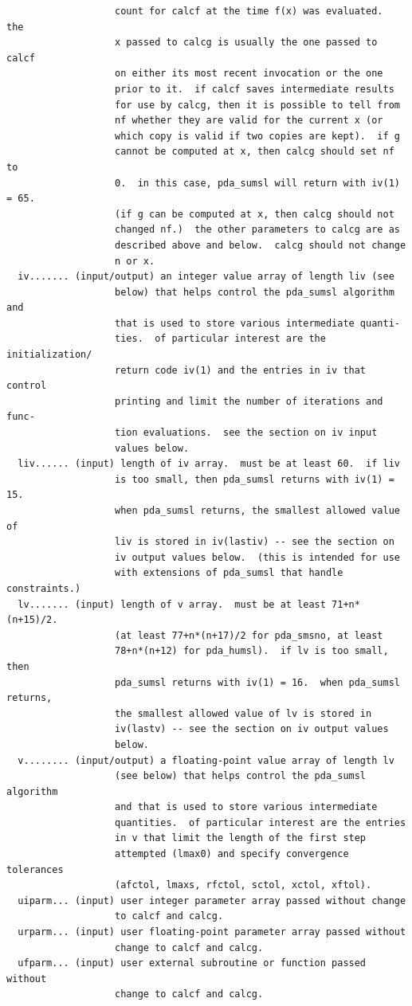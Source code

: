 \documentclass[11pt,twoside]{article}
\begin{document}
\begin{verbatim}
                   count for calcf at the time f(x) was evaluated.  the
                   x passed to calcg is usually the one passed to calcf
                   on either its most recent invocation or the one
                   prior to it.  if calcf saves intermediate results
                   for use by calcg, then it is possible to tell from
                   nf whether they are valid for the current x (or
                   which copy is valid if two copies are kept).  if g
                   cannot be computed at x, then calcg should set nf to
                   0.  in this case, pda_sumsl will return with iv(1) = 65.
                   (if g can be computed at x, then calcg should not
                   changed nf.)  the other parameters to calcg are as
                   described above and below.  calcg should not change
                   n or x.
  iv....... (input/output) an integer value array of length liv (see
                   below) that helps control the pda_sumsl algorithm and
                   that is used to store various intermediate quanti-
                   ties.  of particular interest are the initialization/
                   return code iv(1) and the entries in iv that control
                   printing and limit the number of iterations and func-
                   tion evaluations.  see the section on iv input
                   values below.
  liv...... (input) length of iv array.  must be at least 60.  if liv
                   is too small, then pda_sumsl returns with iv(1) = 15.
                   when pda_sumsl returns, the smallest allowed value of
                   liv is stored in iv(lastiv) -- see the section on
                   iv output values below.  (this is intended for use
                   with extensions of pda_sumsl that handle constraints.)
  lv....... (input) length of v array.  must be at least 71+n*(n+15)/2.
                   (at least 77+n*(n+17)/2 for pda_smsno, at least
                   78+n*(n+12) for pda_humsl).  if lv is too small, then
                   pda_sumsl returns with iv(1) = 16.  when pda_sumsl returns,
                   the smallest allowed value of lv is stored in
                   iv(lastv) -- see the section on iv output values
                   below.
  v........ (input/output) a floating-point value array of length lv
                   (see below) that helps control the pda_sumsl algorithm
                   and that is used to store various intermediate
                   quantities.  of particular interest are the entries
                   in v that limit the length of the first step
                   attempted (lmax0) and specify convergence tolerances
                   (afctol, lmaxs, rfctol, sctol, xctol, xftol).
  uiparm... (input) user integer parameter array passed without change
                   to calcf and calcg.
  urparm... (input) user floating-point parameter array passed without
                   change to calcf and calcg.
  ufparm... (input) user external subroutine or function passed without
                   change to calcf and calcg.
 

\end{verbatim}
\end{document}
